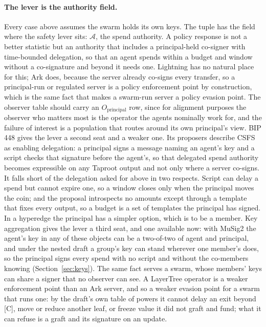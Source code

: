 \documentclass[11pt]{article}
\theoremstyle{plain}
\theoremstyle{definition}
\theoremstyle{remark}
\newcommand{\auth}{\mathcal{A}}
\begin{document}
\paragraph{The lever is the authority field.} Every case above assumes the swarm holds its own keys. The tuple has the field where the safety lever sits: $\auth$, the spend authority. A policy response is not a better statistic but an authority that includes a principal-held co-signer with time-bounded delegation, so that an agent spends within a budget and window without a co-signature and beyond it needs one. Lightning has no natural place for this; Ark does, because the server already co-signs every transfer, so a principal-run or regulated server is a policy enforcement point by construction, which is the same fact that makes a swarm-run server a policy evasion point. The observer table should carry an $O_{\mathrm{principal}}$ row, since for alignment purposes the observer who matters most is the operator the agents nominally work for, and the failure of interest is a population that routes around its own principal's view. BIP 448 gives the lever a second seat and a weaker one. Its proposers describe CSFS as enabling delegation: a principal signs a message naming an agent's key and a script checks that signature before the agent's, so that delegated spend authority becomes expressible on any Taproot output and not only where a server co-signs. It falls short of the delegation asked for above in two respects. Script can delay a spend but cannot expire one, so a window closes only when the principal moves the coin; and the proposal introspects no amounts except through a template that fixes every output, so a budget is a set of templates the principal has signed. In a hyperedge the principal has a simpler option, which is to be a member. Key aggregation gives the lever a third seat, and one available now: with MuSig2 the agent's key in any of these objects can be a two-of-two of agent and principal, and under the nested draft a group's key can stand wherever one member's does, so the principal signs every spend with no script and without the co-members knowing (Section~\ref{sec:keys}). The same fact serves a swarm, whose members' keys can share a signer that no observer can see. A LayerTree operator is a weaker enforcement point than an Ark server, and so a weaker evasion point for a swarm that runs one: by the draft's own table of powers it cannot delay an exit beyond [C], move or reduce another leaf, or freeze value it did not graft and fund; what it can refuse is a graft and its signature on an update.
\end{document}
